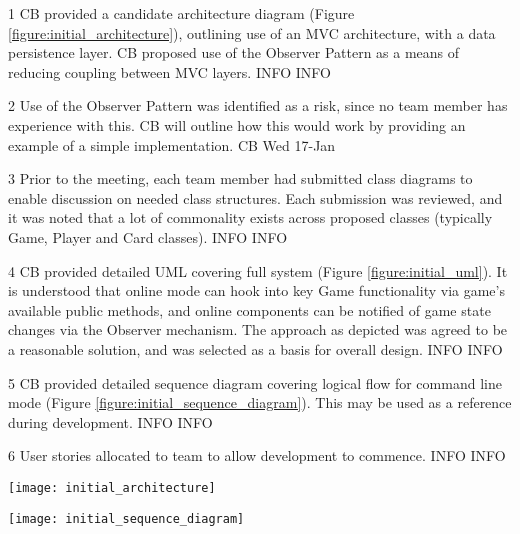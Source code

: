 \begin{momitems}
	\momitem
	{1}
	{CB provided a candidate architecture diagram (Figure \ref{figure:initial_architecture}), outlining use of an MVC architecture, with a data persistence layer. CB proposed use of the Observer Pattern as a means of reducing coupling between MVC layers.}
	{INFO}
	{INFO}

	\momitem
	{2}
	{Use of the Observer Pattern was identified as a risk, since no team member has experience with this. CB will outline how this would work by providing an example of a simple implementation.}
	{CB}
	{Wed 17-Jan}

	\momitem
	{3}
	{Prior to the meeting, each team member had submitted class diagrams to enable discussion on needed class structures. Each submission was reviewed, and it was noted that a lot of commonality exists across proposed classes (typically Game, Player and Card classes).}
	{INFO}
	{INFO}

	\momitem
	{4}
	{CB provided detailed UML covering full system (Figure \ref{figure:initial_uml}). It is understood that online mode can hook into key Game functionality via game's available public methods, and online components can be notified of game state changes via the Observer mechanism. The approach as depicted was agreed to be a reasonable solution, and was selected as a basis for overall design.}
	{INFO}
	{INFO}

	\momitem
	{5}
	{CB provided detailed sequence diagram covering logical flow for command line mode (Figure \ref{figure:initial_sequence_diagram}). This may be used as a reference during development.}
	{INFO}
	{INFO}

	\momitem
	{6}
	{User stories allocated to team to allow development to commence.}
	{INFO}
	{INFO}
\end{momitems}

\begin{center}
	\texttt{[image: initial\_architecture]}
	\label{figure:initial_architecture}
\end{center}

\begin{center}
	\label{figure:initial_uml}
\end{center}

\begin{center}
	\texttt{[image: initial\_sequence\_diagram]}
	\label{figure:initial_sequence_diagram}
\end{center}
